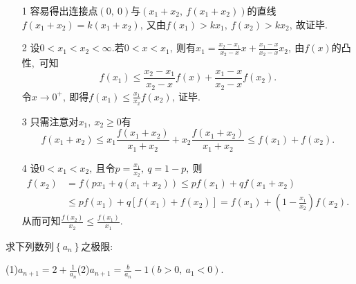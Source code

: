 	\begin{solution}
		\begin{itemize}
			\item[1]容易得出连接点$(0,\ 0)$与$(x_1+x_2,\ f(x_1+x_2))$的直线 $f(x_1+x_2)=k(x_1+x_2),\ $又由$f(x_1)>kx_1,\ f(x_2)>kx_2,\ $故证毕.
			\item[2]设$0<x_1<x_2<\infty.$若$0<x<x_1,\ $则有$x_1=\frac{x_2-x_1}{x_2-x}x+\frac{x_1-x}{x_2-x}x_2,\ $由$f(x)$的凸性,\ 可知
			$$f(x_1)\le \frac{x_2-x_1}{x_2-x}f(x)+\frac{x_1-x}{x_2-x}f(x_2).$$
			令$x\rightarrow0^+,\ $即得$f(x_1)\le \frac{x_1}{x_2}f(x_2),\ $证毕.
			\item[3]只需注意对$x_1,\ x_2\ge 0$有
			$$f(x_1+x_2)\le x_1\frac{f(x_1+x_2)}{x_1+x_2}+x_2\frac{f(x_1+x_2)}{x_1+x_2}\le f(x_1)+f(x_2).$$
			\item[4]设$0<x_1<x_2,\ $且令$p=\frac{x_1}{x_2},\ q=1-p,\ $则
			\begin{align*}
				f(x_2)&=f(px_1+q(x_1+x_2))\le pf(x_1)+qf(x_1+x_2)\\
				&\le pf(x_1)+q\left[f(x_1)+f(x_2)\right]=f(x_1) +\left(1-\frac{x_1}{x_2}\right)f(x_2).
			\end{align*}
			从而可知$\frac{f(x_2)}{x_2}\le \frac{f(x_1)}{x_1}.$
		\end{itemize} 
	\end{solution}
	\newpage
	\begin{problem}
		求下列数列$\left\{a_n\right\}$之极限:
		
		(1)$a_{n+1}=2+\frac{1}{a_n}$\quad (2)$a_{n+1}=\frac{b}{a_n}-1(b>0,\ a_1<0).$ 
	\end{problem}
	
